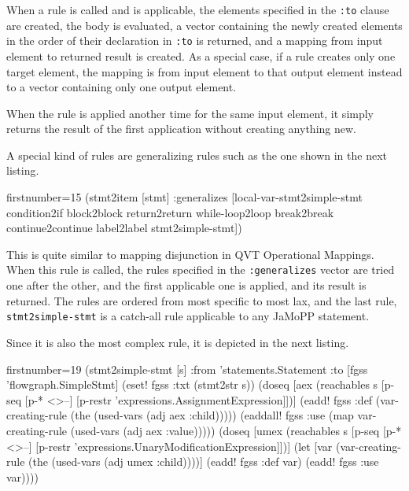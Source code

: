 \documentclass[11pt]{article}
\begin{document}
When a rule is called and is applicable, the elements specified in the
\verb|:to| clause are created, the body is evaluated, a vector containing the
newly created elements in the order of their declaration in \verb|:to| is
returned, and a mapping from input element to returned result is created.  As a
special case, if a rule creates only one target element, the mapping is from
input element to that output element instead to a vector containing only one
output element.

When the rule is applied another time for the same input element, it simply
returns the result of the first application without creating anything new.

A special kind of rules are generalizing rules such as the one shown in the
next listing.

\begin{clojurecode*}{firstnumber=15}
  (stmt2item [stmt]
      :generalizes [local-var-stmt2simple-stmt condition2if block2block
                    return2return while-loop2loop break2break continue2continue
                    label2label stmt2simple-stmt])
\end{clojurecode*}

This is quite similar to mapping disjunction in QVT Operational Mappings.  When
this rule is called, the rules specified in the \verb|:generalizes| vector are
tried one after the other, and the first applicable one is applied, and its
result is returned.  The rules are ordered from most specific to most lax, and
the last rule, \verb|stmt2simple-stmt| is a catch-all rule applicable to any
JaMoPP statement.

Since it is also the most complex rule, it is depicted in the next listing.

\begin{clojurecode*}{firstnumber=19}
  (stmt2simple-stmt [s]
      :from 'statements.Statement
      :to [fgss 'flowgraph.SimpleStmt]
      (eset! fgss :txt (stmt2str s))
      (doseq [aex  (reachables s [p-seq [p-* <>--]
                                  [p-restr 'expressions.AssignmentExpression]])]
        (eadd! fgss :def (var-creating-rule (the (used-vars (adj aex :child)))))
        (eaddall! fgss :use (map var-creating-rule (used-vars (adj aex :value)))))
      (doseq [umex (reachables s [p-seq [p-* <>--]
                                  [p-restr 'expressions.UnaryModificationExpression]])]
        (let [var (var-creating-rule (the (used-vars (adj umex :child))))]
          (eadd! fgss :def var)
          (eadd! fgss :use var))))
\end{clojurecode*}
\end{document}
